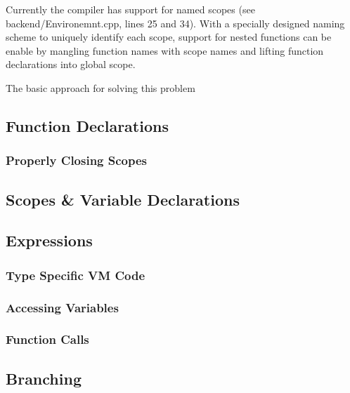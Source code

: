 \begin{todo}
Currently the compiler has support for named scopes (see
backend/Environemnt.cpp, lines 25 and 34). With a specially
designed naming scheme to uniquely identify each scope, support
for nested functions can be enable by mangling function names
with scope names and lifting function declarations into global
scope.
\end{todo}


The basic approach for solving this problem

\subsection{Function Declarations}

\subsubsection{Properly Closing Scopes}

\subsection{Scopes \& Variable Declarations}

\subsection{Expressions}

\subsubsection{Type Specific VM Code}

\subsubsection{Accessing Variables}

\subsubsection{Function Calls}


\subsection{Branching}
